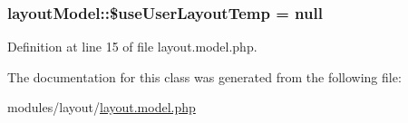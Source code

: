 \subsubsection[{\$use\+User\+Layout\+Temp}]{\setlength{\rightskip}{0pt plus 5cm}layout\+Model\+::\$use\+User\+Layout\+Temp = null}\label{classlayoutModel_a51f307edec8ca62a4cbaffb4833b2d20}


Definition at line 15 of file layout.\+model.\+php.



The documentation for this class was generated from the following file\+:\begin{DoxyCompactItemize}
\item 
modules/layout/\hyperlink{layout_8model_8php}{layout.\+model.\+php}\end{DoxyCompactItemize}
